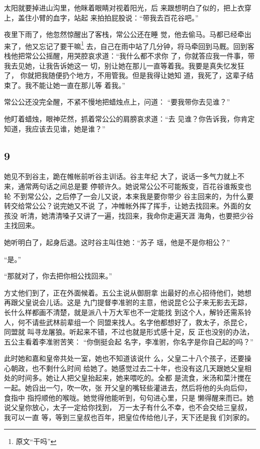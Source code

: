 太阳就要掉进山沟里，他眯着眼睛对视着阳光，后
来跟想明白了似的，把上衣穿上，盖住小臂的血字，站起
来拍拍屁股说：“带我去百花谷吧。”
\newline

夜里下雨了，他忽然惊醒出了客栈，常公公还在睡
觉，他去偷马。马都已经牵出来了，他又忘记了要干嘛\footnote{原文“干吗”}
去，自己在雨中站了几分钟，将马牵回到马厩。回到客
栈他把常公公摇醒，用哭腔哀求道：“我什么都不求你
了，你就答应我一件事，带我去见她，让我告诉她这一
切，别让她在那儿一直等着我。我要是真失忆发狂了，
你就把我随便扔个地方，不用管我。但是我得让她知
道，我死了，这辈子结束了。我不能让她一直在那儿等
着我。”

常公公还没完全醒，不紧不慢地把蜡烛点上，问道：
“要我带你去见谁？”

他盯着蜡烛，眼神茫然，抓着常公公的肩膀哀求道：“去
见谁？你告诉我，你肯定知道，我应该去见谁，她是谁？”
\newline

{\centering\subsection{9}}

她见不到谷主，跪在帷帐前听谷主训话。谷主年纪
大了，说话一多气力就上不来，通常两句话之间总是要
停顿许久。她说常公公不可能叛变，百花谷谁叛变也轮
不到常公公，之后停了一会儿又说，本来我是要你带少
谷主回来的，为什么要转交给常公公？说完她又不说
了，冲帷帐外挥了挥手，让她去找回来。外面的女孩没
听清，她清清嗓子又讲了一遍，找回来，我命你走遍天涯
海角，也要把少谷主找回来。

她听明白了，起身后退。这时谷主叫住她：“苏子
瑶，他是不是你相公？”

“是。”

“那就对了，你去把你相公找回来。”
\newline

方丈他们到了，正在外面候着。五公主说从御厨拿
出最好的点心招待他们，她想再跟父皇说会儿话。这是
九门提督李准驸的主意，他说昆仑公子来无影去无踪，
长什么样都画不清楚，就是派八十万大军也不一定能找
到这个人，解铃还需系铃人，何不请些武林前辈组一个
同盟来找人。名字他都想好了，救太子，杀昆仑，同盟就
叫寻龙屠狼。听起来不错，不过也就是形式感十足，反
正也没别的办法，五公主看着李准驸苦笑： “你倒挺会起
名字，李准驸，你名字是你自己起的吗？”

此时她和嘉和皇帝共处一室，她也不知道该说什
么，父皇二十八个孩子，还要操心朝政，也不剩什么时间
给她了。她感觉过去二十年，也没有这几天跟她父皇相
处的时间多。她让人把父皇抬起来，她来喂吃的。全都
是流食，米汤和菜汁搅在一起。她舀出一勺，吹一吹，张
开父皇的嘴轻些灌进去，然后将他的头向后仰，食指中
指捋顺他的喉咙。她觉得他能听到，句句进心里，只是
懒得醒来而已。她说父皇你放心，太子一定给你找到，
万一太子有什么不幸，也不会交给三皇叔，我可以一直
等，等到三皇叔也百年，把皇位传给他儿子，天下还是我
们刘家的。

